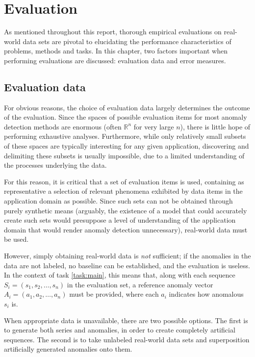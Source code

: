 \chapter{Evaluation}
\label{ch:evaluation}

As mentioned throughout this report, thorough empirical evaluations on real-world data sets are pivotal to elucidating the performance characteristics of problems, methods and tasks. In this chapter, two factors important when performing evaluations are discussed: evaluation data and error measures.

\section{Evaluation data}
\label{sect:evaluation_data}

For obvious reasons, the choice of evaluation data largely determines the outcome of the evaluation. Since the spaces of possible evaluation items for most anomaly detection methods are enormous (often $\mathbb{R}^n$ for very large $n$), there is little hope of performing exhaustive analyses. Furthermore, while only relatively small subsets of these spaces are typically interesting for any given application, discovering and delimiting these subsets is usually impossible, due to a limited understanding of the processes underlying the data.

For this reason, it is critical that a set of evaluation items is used, containing as representative a selection of relevant phenomena exhibited by data items in the application domain as possible. Since such sets can not be obtained through purely synthetic means (arguably, the existence of a model that could accurately create such sets would presuppose a level of understanding of the application domain that would render anomaly detection unnecessary), real-world data must be used.

However, simply obtaining real-world data is \emph{not} sufficient; if the anomalies in the data are not labeled, no baseline can be established, and the evaluation is useless. In the context of task \ref{task:main}, this means that, along with each sequence $S_i = (s_1, s_2, \dots, s_n)$ in the evaluation set, a reference anomaly vector $A_i = (a_1, a_2, \dots, a_n)$ must be provided, where each $a_i$ indicates how anomalous $s_i$ is.

When appropriate data is unavailable, there are two possible options. The first is to generate both series and anomalies, in order to create completely artificial sequences. The second is to take unlabeled real-world data sets and superposition artificially generated anomalies onto them.

